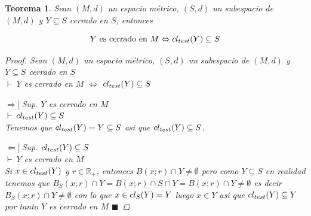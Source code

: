 \documentclass[oneside]{book} %
\theoremstyle{Teorema}
\newtheorem{Teorema}[Definicion]{Teorema}
\theoremstyle{Ejemplos}
\theoremstyle{[Obs]}
\def \test {test}
\newcommand{\cerradura}[2][\test]{\ifx \test #1 {\overline{#2}} \else {cl_{#1}(#2)} \fi} %
\renewcommand{\{}{\left\lbrace} %
\renewcommand{\}}{\right\rbrace} %
\newcommand{\n}{\cap} %
\renewcommand{\sc}{\subseteq} %
\newcommand{\R}{\mathbb{R}} %
\renewcommand{\qed}{$\blacksquare$} %
\newcommand{\pd}{$\vdash\ $} %
\newcommand{\necesidad}{$\Rightarrow]\ $} %
\newcommand{\suficiencia}{$\Leftarrow]\ $} %
\begin{document}
			\begin{Teorema}\setlength{\parindent}{0em}
			
				Sean $(M, d)$ un espacio métrico, $(S, d)$ un subespacio de $(M, d)$ y $Y \sc S$ cerrado en $S$, entonces 

				\[ Y \text{ es cerrado en } M \Leftrightarrow \cerradura{Y} \sc S \]

				\begin{proof}
					
					Sean $(M, d)$ un espacio métrico, $(S, d)$ un subespacio de $(M, d)$ y $Y \sc S$ cerrado en $S$ \\ 
					\pd $Y$ es cerrado en $M$ $\Leftrightarrow$ $\cerradura{Y} \sc S$
					
					\necesidad Sup. $Y$ es cerrado en $M$ \\ 
					\pd $\cerradura{Y} \sc S$ \\ 
					Tenemos que $\cerradura{Y} = Y \sc S$ asi que $\cerradura{Y} \sc S$.

					\suficiencia Sup. $\cerradura{Y} \sc S$ \\ 
					\pd $Y$ es cerrado en $M$ \\ 
					Si $x \in \cerradura{Y}$ y $r \in \R_{+}$, entonces $B(x;r) \n Y \neq \emptyset$ pero como $Y \sc S$ en realidad tenemos que $B_{S}(x;r) \n Y = B(x;r) \n S \n Y = B(x;r) \n Y \neq \emptyset$ es decir $B_{S}(x;r) \n Y \neq \emptyset$ con lo que $x \in \cerradura[S]{Y} = Y$ luego $x \in Y$ asi que $\cerradura{Y} \sc Y$ por tanto $Y$ es cerrado en $M$ \qed 

				\end{proof}
			
			\end{Teorema}
\end{document}
